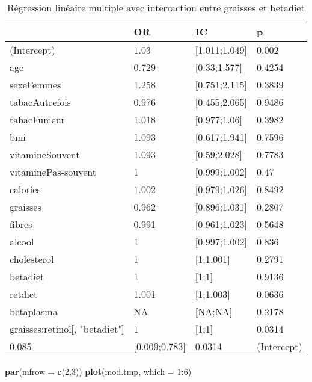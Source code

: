 \documentclass[]{article}
\newenvironment{Shaded}{\begin{snugshade}}{\end{snugshade}}
\newcommand{\KeywordTok}[1]{\textcolor[rgb]{0.13,0.29,0.53}{\textbf{#1}}}
\newcommand{\DataTypeTok}[1]{\textcolor[rgb]{0.13,0.29,0.53}{#1}}
\newcommand{\DecValTok}[1]{\textcolor[rgb]{0.00,0.00,0.81}{#1}}
\newcommand{\OperatorTok}[1]{\textcolor[rgb]{0.81,0.36,0.00}{\textbf{#1}}}
\newcommand{\NormalTok}[1]{#1}
\begin{document}
\begin{table}

\caption{\label{tab:unnamed-chunk-89}Régression linéaire multiple avec interraction entre graisses et betadiet}
\centering
\begin{tabular}[t]{l|l|l|l}
\hline
  & OR & IC & p\\
\hline
\rowcolor[HTML]{BBD2E1}  (Intercept) & 1.03 & [1.011;1.049] & 0.002\\
\hline
age & 0.729 & [0.33;1.577] & 0.4254\\
\hline
\rowcolor[HTML]{BBD2E1}  sexeFemmes & 1.258 & [0.751;2.115] & 0.3839\\
\hline
tabacAutrefois & 0.976 & [0.455;2.065] & 0.9486\\
\hline
\rowcolor[HTML]{BBD2E1}  tabacFumeur & 1.018 & [0.977;1.06] & 0.3982\\
\hline
bmi & 1.093 & [0.617;1.941] & 0.7596\\
\hline
\rowcolor[HTML]{BBD2E1}  vitamineSouvent & 1.093 & [0.59;2.028] & 0.7783\\
\hline
vitaminePas-souvent & 1 & [0.999;1.002] & 0.47\\
\hline
\rowcolor[HTML]{BBD2E1}  calories & 1.002 & [0.979;1.026] & 0.8492\\
\hline
graisses & 0.962 & [0.896;1.031] & 0.2807\\
\hline
\rowcolor[HTML]{BBD2E1}  fibres & 0.991 & [0.961;1.023] & 0.5648\\
\hline
alcool & 1 & [0.997;1.002] & 0.836\\
\hline
\rowcolor[HTML]{BBD2E1}  cholesterol & 1 & [1;1.001] & 0.2791\\
\hline
betadiet & 1 & [1;1] & 0.9136\\
\hline
\rowcolor[HTML]{BBD2E1}  retdiet & 1.001 & [1;1.003] & 0.0636\\
\hline
betaplasma & NA & [NA;NA] & 0.2178\\
\hline
\rowcolor[HTML]{BBD2E1}  graisses:retinol[, "betadiet"] & 1 & [1;1] & 0.0314\\
\hline
0.085 & [0.009;0.783] & 0.0314 & (Intercept)\\
\hline
\end{tabular}
\end{table}

\begin{Shaded}
\begin{Highlighting}[]
\KeywordTok{par}\NormalTok{(}\DataTypeTok{mfrow =} \KeywordTok{c}\NormalTok{(}\DecValTok{2}\NormalTok{,}\DecValTok{3}\NormalTok{))}
\KeywordTok{plot}\NormalTok{(mod.tmp, }\DataTypeTok{which =} \DecValTok{1}\OperatorTok{:}\DecValTok{6}\NormalTok{)}
\end{Highlighting}
\end{Shaded}
\end{document}
